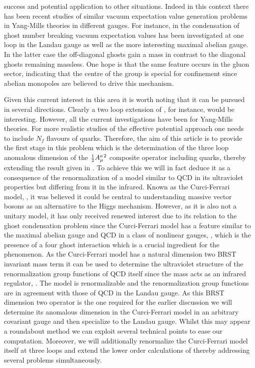 \documentclass[a4paper,11pt]{article}
\newcommand{\half}{\mbox{\small{$\frac{1}{2}$}}}
\newcommand{\Nf}{N_{\!f}}
\begin{document}
success and potential application to other situations. Indeed in this context 
there has been recent studies of similar vacuum expectation value generation 
problems in Yang-Mills theories in different gauges. For instance, in 
\cite{6,7,8,9,10,11,12,13} the condensation of ghost number breaking vacuum 
expectation values has been investigated at one loop in the Landau gauge as 
well as the more interesting maximal abelian gauge. In the latter case the 
off-diagonal ghosts gain a mass in contrast to the diagonal ghosts remaining 
massless. One hope is that the same feature occurs in the gluon sector, 
indicating that the centre of the group is special for confinement since 
abelian monopoles are believed to drive this mechanism.  

Given this current interest in this area it is worth noting that it can be
pursued in several directions. Clearly a two loop extension of \cite{12,13}, 
for instance, would be interesting. However, all the current investigations 
have been for Yang-Mills theories. For more realistic studies of the effective 
potential approach one needs to include $\Nf$ flavours of quarks. Therefore, 
the aim of this article is to provide the first stage in this problem which is 
the determination of the three loop anomalous dimension of the 
$\half A^{a \, 2}_\mu$ composite operator including quarks, thereby extending
the result given in \cite{2}. To achieve this we will in fact deduce it as a 
consequence of the renormalization of a model similar to QCD in its ultraviolet
properties but differing from it in the infrared. Known as the Curci-Ferrari 
model, \cite{17}, it was believed it could be central to understanding massive 
vector bosons as an alternative to the Higgs mechanism. However, as it is also 
not a unitary model, \cite{18,19,20,21,22,23} it has only received renewed 
interest due to its relation to the ghost condensation problem since the 
Curci-Ferrari model has a feature similar to the maximal abelian gauge and
QCD in a class of nonlinear gauges, \cite{24,25}, which is the presence of a
four ghost interaction which is a crucial ingredient for the phenomenon. As the
Curci-Ferrari model has a natural dimension two BRST invariant mass term it can
be used to determine the ultraviolet structure of the renormalization group 
functions of QCD itself since the mass acts as an infrared regulator, 
\cite{17,20,21,22,23,26,27}. The model is renormalizable and the 
renormalization group functions are in agreement with those of QCD in the 
Landau gauge. As this BRST dimension two operator is the one required for the 
earlier discussion we will determine its anomalous dimension in the 
Curci-Ferrari model in an arbitrary covariant gauge and then specialize to the 
Landau gauge. Whilst this may appear a roundabout method we can exploit several
technical points to ease our computation. Moreover, we will additionally 
renormalize the Curci-Ferrari model itself at three loops and extend the lower 
order calculations of \cite{17,21,28,29} thereby addressing several problems
simultaneously. 
\end{document}
